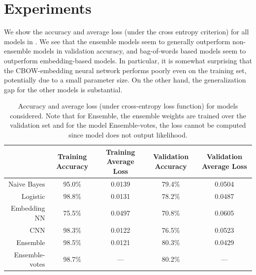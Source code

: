 \documentclass[11pt]{article}
\begin{document}
\section{Experiments}
We show the accuracy and average loss (under the cross entropy criterion) for
all models in . We see that the ensemble models seem to
generally outperform non-ensemble models in validation accuracy, and
bag-of-words based models seem to outperform embedding-based models. In
particular, it is somewhat surprising that the CBOW-embedding neural network
performs poorly even on the training set, potentially due to a small parameter
size. On the other hand, the generalization gap for the other models is
substantial. 


\begin{landscape}
  \begin{table}[t]
\centering
\begin{tabular}{rcccc}
\toprule
{} & Training Accuracy &  Training Average Loss & Validation Accuracy &  Validation Average Loss \\
\midrule
Naive Bayes    &             95.0\% &                 0.0139 &               79.4\% &                   0.0504 \\
Logistic       &             98.8\% &                 0.0131 &               78.2\% &                   0.0487 \\
Embedding NN   &             75.5\% &                 0.0497 &               70.8\% &                   0.0605 \\
CNN            &             98.3\% &                 0.0122 &               76.5\% &                   0.0523 \\
Ensemble       &             98.5\% &                 0.0121 &               80.3\% &                   0.0429 \\
Ensemble-votes &             98.7\% &                    --- &               80.2\% &                      --- \\
\bottomrule
\end{tabular}
\caption{\label{tab:results} Accuracy and average loss (under cross-entropy loss
function) for models considered. Note that for Ensemble, the ensemble weights
are
trained over the validation set and for the model Ensemble-votes, the loss
cannot be computed since model does not output likelihood.}
\end{table}


\end{landscape}
\end{document}
